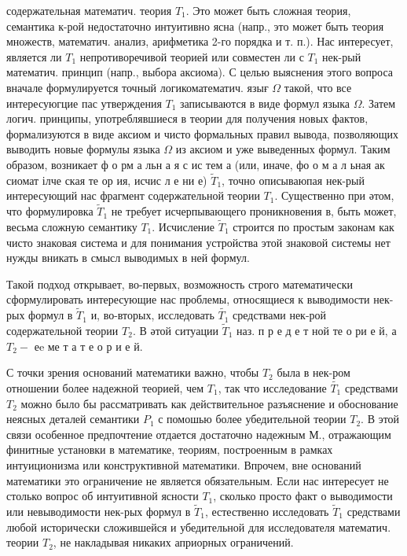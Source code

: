 \documentclass[10pt]{article}
\begin{document}
содержательная математич. теория $T_{1}$. Это может быть сложная теория, семантика к-рой недостаточно интуитивно ясна (напр., это может быть теория множеств, математич. анализ, арифметика 2-го порядка и т. п.). Нас интересует, является ли $T_{1}$ непротиворечивой теорией или совместен ли с $T_{1}$ нек-рый математич. принцип (напр., выбора аксиома). С целью выяснения этого вопроса вначале формулируется точный логикоматематич. язығ $\Omega$ такой, что все интересуюгцие пас утверждения $T_{1}$ записываются в виде формул языка $\Omega$. Затем логич. принципы, употреблявшиеся в теории для получения новых фактов, формализуются в виде аксиом и чисто формальных правил вывода, позволяющих выводить новые формулы языка $\Omega$ из аксиом и уже выведенных формул. Таким образом, возникает ф о рм а льн а я с ис тем а (или, иначе, фо о м а л ьная ак сиомат ілче ская те ор ия, исчис л е ни е) $\tilde{T}_{1}$, точно описываюпая нек-рый интересующий нас фрагмент содержательной теории $T_{1}$. Существенно при әтом, что формулировка $\tilde{T}_{1}$ не требует исчерпывающего проникновения в, быть может, весьма сложную семантику $T_{1}$. Исчисление $\tilde{T}_{1}$ строится по простым законам как чисто знаковая система и для понимания устройства этой знаковой системы нет нужды вникать в смысл выводимых в ней формул.



Такой подход открывает, во-первых, возможность строго математически сформулировать интересующие нас проблемы, относящиеся к выводимости нек-рых формул в $\tilde{T}_{1}$ и, во-вторых, исследовать $\tilde{T_{1}}$ средствами нек-рой содержательной теории $T_{2}$. В әтой ситуации $\tilde{T}_{1}$ наз. п р е д е т ной те о ри е й, а $T_{2}-$ еe ме т а т е о р и е й.



С точки зрения оснований математики важно, чтобы $T_{2}$ была в нек-ром отношении более надежной теорией, чем $T_{1}$, так что исследование $\tilde{T_{1}}$ средствами $T_{2}$ можно было бы рассматривать как действительное разъяснение и обоснование неясных деталей семантики $P_{1}$ с помошью более убедительной теории $T_{2}$. В этой связи особенное предпочтение отдается достаточно надежным М., отражающим финитные установки в математике, теориям, построенным в рамках интуиционизма или конструктивной математики. Впрочем, вне оснований математики это ограничение не является обязательным. Если нас интересует не столько вопрос об интуитивной ясности $T_{1}$, сколько просто факт о выводимости или невыводимости нек-рых формул в $\tilde{T}_{1}$, естественно исследовать $\tilde{T}_{1}$ средствами любой исторически сложившейся и убедительной для исследователя математич. теории $T_{2}$, не накладывая никаких априорных ограничений.
\end{document}
